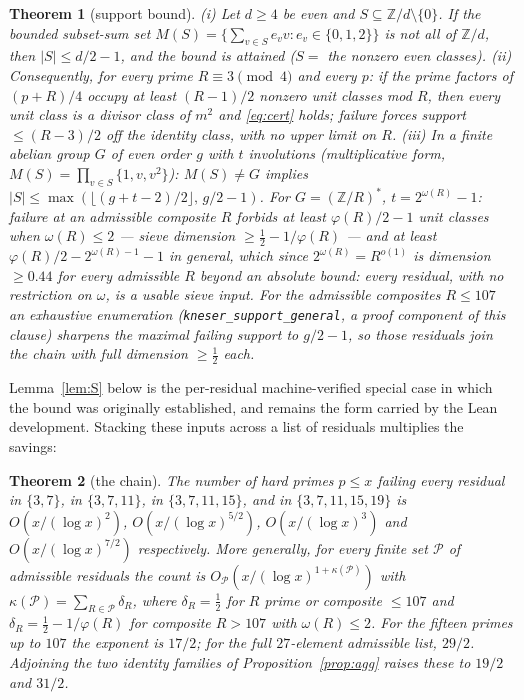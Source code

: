 \documentclass[11pt]{article}
\theoremstyle{plain}
\newtheorem{theorem}{Theorem}[section]
\theoremstyle{remark}
\theoremstyle{plain}
\numberwithin{equation}{section}
\begin{document}
\begin{theorem}[support bound]\label{thm:S}
\textup{(i)} Let $d \ge 4$ be even and $S \subseteq \mathbb{Z}/d
\setminus \{0\}$. If the bounded subset-sum set
$M(S) = \{\sum_{v \in S} e_v v : e_v \in \{0,1,2\}\}$
is not all of $\mathbb{Z}/d$, then $|S| \le d/2 - 1$, and the bound is
attained ($S =$ the nonzero even classes). \textup{(ii)} Consequently,
for \emph{every} prime $R \equiv 3 \pmod 4$ and every $p$: if the prime
factors of $(p+R)/4$ occupy at least $(R-1)/2$ nonzero unit classes
mod $R$, then every unit class is a divisor class of $m^2$ and
\eqref{eq:cert} holds; failure forces support $\le (R-3)/2$ off the
identity class, with no upper limit on $R$. \textup{(iii)} In a
finite abelian group $G$ of even order $g$ with $t$ involutions
(multiplicative form, $M(S) = \prod_{v \in S}\{1, v, v^2\}$):
$M(S) \ne G$ implies
$|S| \le \max(\lfloor (g+t-2)/2 \rfloor,\, g/2 - 1)$. For
$G = (\mathbb{Z}/R)^*$, $t = 2^{\omega(R)} - 1$: failure at an
admissible composite $R$ forbids at least $\varphi(R)/2 - 1$ unit
classes when $\omega(R) \le 2$ --- sieve dimension
$\ge \tfrac12 - 1/\varphi(R)$ --- and at least
$\varphi(R)/2 - 2^{\omega(R)-1} - 1$ in general, which since
$2^{\omega(R)} = R^{o(1)}$ is dimension $\ge 0.44$ for every
admissible $R$ beyond an absolute bound: \emph{every} residual, with
no restriction on $\omega$, is a usable sieve input. For the
admissible composites $R \le 107$ an exhaustive enumeration
(\texttt{kneser\_support\_general}, a proof component of this clause)
sharpens the maximal failing support to $g/2 - 1$, so those residuals
join the chain with full dimension $\ge \tfrac12$ each.
\end{theorem}

Lemma~\ref{lem:S} below is the per-residual machine-verified special
case in which the bound was originally established, and remains the
form carried by the Lean development. Stacking these inputs across a
list of residuals multiplies the savings:

\begin{theorem}[the chain]\label{thm:FG}
The number of hard primes $p \le x$ failing every residual in
$\{3, 7\}$, in $\{3, 7, 11\}$, in $\{3, 7, 11, 15\}$, and in
$\{3, 7, 11, 15, 19\}$ is $O(x/(\log x)^{2})$, $O(x/(\log x)^{5/2})$,
$O(x/(\log x)^{3})$ and $O(x/(\log x)^{7/2})$ respectively. More
generally, for \emph{every} finite set $\mathcal{P}$ of admissible
residuals the count is
$O_{\mathcal{P}}(x/(\log x)^{1+\kappa(\mathcal{P})})$ with
$\kappa(\mathcal{P}) = \sum_{R \in \mathcal{P}} \delta_R$, where
$\delta_R = \tfrac12$ for $R$ prime or composite $\le 107$ and
$\delta_R = \tfrac12 - 1/\varphi(R)$ for composite $R > 107$ with
$\omega(R) \le 2$. For the fifteen primes up to $107$ the exponent is
$17/2$; for the full $27$-element admissible list, $29/2$. Adjoining
the two identity families of Proposition~\ref{prop:agg} raises these
to $19/2$ and $31/2$.
\end{theorem}
\end{document}
